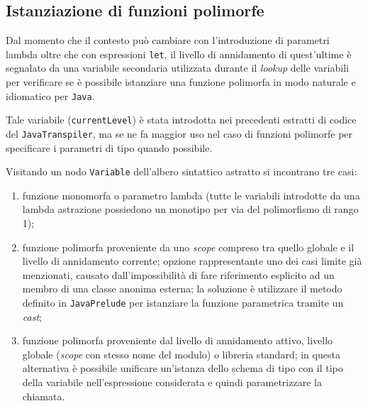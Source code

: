 \subsection{Istanziazione di funzioni polimorfe}
\label{sec:5-14-polymorphic-functions-instantiation}

Dal momento che il contesto può cambiare con l'introduzione di parametri lambda oltre che con espressioni \texttt{let},
il livello di annidamento di quest'ultime è segnalato da una variabile secondaria utilizzata durante il \textit{lookup}
delle variabili per verificare se è possibile istanziare una funzione polimorfa in modo naturale e idiomatico per \texttt{Java}.


Tale variabile (\texttt{currentLevel}) è stata introdotta nei precedenti estratti di codice del \texttt{JavaTranspiler},
ma se ne fa maggior uso nel caso di funzioni polimorfe per specificare i parametri di tipo quando possibile.

\noindent Visitando un nodo \texttt{Variable} dell'albero sintattico astratto si incontrano tre casi:
\begin{enumerate}
    \item funzione monomorfa o parametro lambda (tutte le variabili introdotte da una lambda astrazione
          possiedono un monotipo per via del polimorfismo di rango 1);
    \item funzione polimorfa proveniente da uno \textit{scope} compreso tra quello globale e il livello di annidamento corrente;
          opzione rappresentante uno dei casi limite già menzionati, causato dall'impossibilità di fare riferimento
          esplicito ad un membro di una classe anonima esterna; la soluzione è utilizzare il metodo definito in \texttt{JavaPrelude}
          per istanziare la funzione parametrica tramite un \textit{cast};
    \item funzione polimorfa proveniente dal livello di annidamento attivo, livello globale
          (\textit{scope} con stesso nome del modulo) o libreria standard; in questa alternativa è possibile unificare un'istanza
          dello schema di tipo con il tipo della variabile nell'espressione considerata e quindi parametrizzare la chiamata.
\end{enumerate}

\newpage

